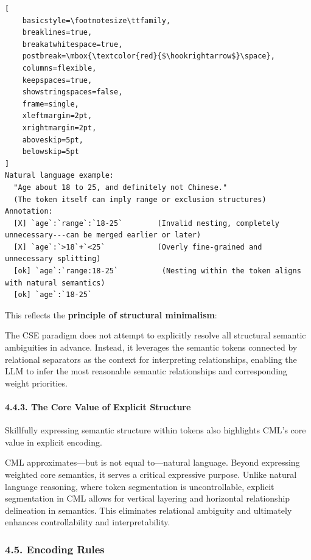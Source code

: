 \documentclass[conference]{IEEEtran}
\begin{document}
\begin{lstlisting}[
    basicstyle=\footnotesize\ttfamily,
    breaklines=true,
    breakatwhitespace=true,
    postbreak=\mbox{\textcolor{red}{$\hookrightarrow$}\space},
    columns=flexible,
    keepspaces=true,
    showstringspaces=false,
    frame=single,
    xleftmargin=2pt,
    xrightmargin=2pt,
    aboveskip=5pt,
    belowskip=5pt
]
Natural language example:
  "Age about 18 to 25, and definitely not Chinese."
  (The token itself can imply range or exclusion structures)
Annotation:
  [X] `age`:`range`:`18-25`        (Invalid nesting, completely unnecessary---can be merged earlier or later)
  [X] `age`:`>18`+`<25`            (Overly fine-grained and unnecessary splitting)
  [ok] `age`:`range:18-25`          (Nesting within the token aligns with natural semantics)
  [ok] `age`:`18-25`
\end{lstlisting}



This reflects the \textbf{principle of structural minimalism}:

The CSE paradigm does not attempt to explicitly resolve all structural
semantic ambiguities in advance. Instead, it leverages the semantic
tokens connected by relational separators as the context for
interpreting relationships, enabling the LLM to infer the most
reasonable semantic relationships and corresponding weight priorities.

\paragraph{4.4.3. The Core Value of Explicit
Structure}\label{443-the-core-value-of-explicit-structure}

Skillfully expressing semantic structure within tokens also highlights
CML's core value in explicit encoding.

CML approximates---but is not equal to---natural language. Beyond
expressing weighted core semantics, it serves a critical expressive
purpose. Unlike natural language reasoning, where token segmentation is
uncontrollable, explicit segmentation in CML allows for vertical
layering and horizontal relationship delineation in semantics. This
eliminates relational ambiguity and ultimately enhances controllability
and interpretability.

\subsubsection{4.5. Encoding Rules}\label{45-encoding-rules}
\end{document}
